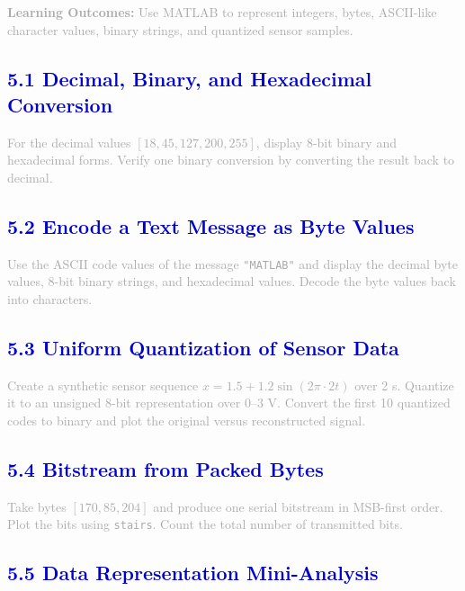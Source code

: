 \documentclass[12pt,a4paper]{article}
\begin{document}
\textcolor{darkgray}{\textbf{Learning Outcomes:} Use MATLAB to represent integers, bytes, ASCII-like character values, binary strings, and quantized sensor samples.}

\subsection*{\large\textbf{\textcolor{mediumblue}{5.1 Decimal, Binary, and Hexadecimal Conversion}}}

\textcolor{darkgray}{
For the decimal values $[18, 45, 127, 200, 255]$, display 8-bit binary and hexadecimal forms. Verify one binary conversion by converting the result back to decimal.
}

\subsection*{\large\textbf{\textcolor{mediumblue}{5.2 Encode a Text Message as Byte Values}}}

\textcolor{darkgray}{
Use the ASCII code values of the message \texttt{"MATLAB"} and display the decimal byte values, 8-bit binary strings, and hexadecimal values. Decode the byte values back into characters.
}

\subsection*{\large\textbf{\textcolor{mediumblue}{5.3 Uniform Quantization of Sensor Data}}}

\textcolor{darkgray}{
Create a synthetic sensor sequence $x = 1.5 + 1.2 \sin(2\pi \cdot 2t)$ over 2 s. Quantize it to an unsigned 8-bit representation over 0--3 V. Convert the first 10 quantized codes to binary and plot the original versus reconstructed signal.
}

\subsection*{\large\textbf{\textcolor{mediumblue}{5.4 Bitstream from Packed Bytes}}}

\textcolor{darkgray}{
Take bytes $[170, 85, 204]$ and produce one serial bitstream in MSB-first order. Plot the bits using \texttt{stairs}. Count the total number of transmitted bits.
}

\subsection*{\large\textbf{\textcolor{mediumblue}{5.5 Data Representation Mini-Analysis}}}
\end{document}
